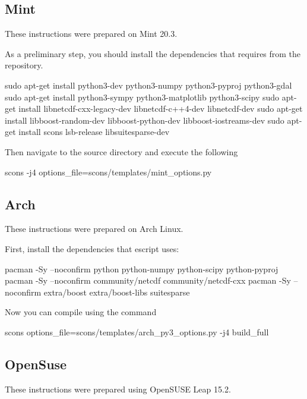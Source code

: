 \subsection{Mint}\label{sec:mintsrc}
These instructions were prepared on Mint 20.3. \newline

\noindent As a preliminary step, you should install the dependencies that \esfinley requires from the repository.
\begin{shellCode}
sudo apt-get install python3-dev python3-numpy python3-pyproj python3-gdal
sudo apt-get install python3-sympy python3-matplotlib python3-scipy
sudo apt-get install libnetcdf-cxx-legacy-dev libnetcdf-c++4-dev libnetcdf-dev
sudo apt-get install libboost-random-dev libboost-python-dev libboost-iostreams-dev
sudo apt-get install scons lsb-release libsuitesparse-dev
\end{shellCode}

\noindent Then navigate to the source directory and execute the following 
\begin{shellCode}
scons -j4 options_file=scons/templates/mint_options.py
\end{shellCode}

\subsection{Arch}\label{sec:archsrc}
These instructions were prepared on Arch Linux. \newline

First, install the dependencies that escript uses:
\begin{shellCode}
pacman -Sy --noconfirm python python-numpy python-scipy python-pyproj
pacman -Sy --noconfirm community/netcdf community/netcdf-cxx
pacman -Sy --noconfirm extra/boost extra/boost-libs suitesparse
\end{shellCode}

Now you can compile \escript using the command
\begin{shellCode}
scons options_file=scons/templates/arch_py3_options.py -j4 build_full
\end{shellCode}

\subsection{OpenSuse}\label{sec:susesrc}
These instructions were prepared using OpenSUSE Leap 15.2. \newline

